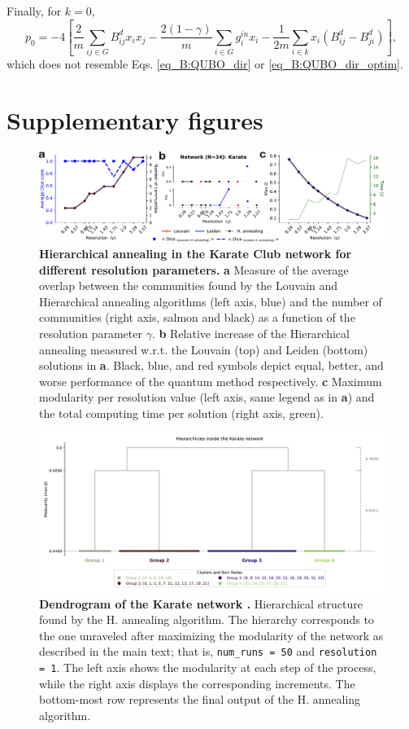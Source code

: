 \documentclass[pdflatex,sn-mathphys-num]{sn-jnl}%
\begin{document}
Finally, for $k=0$, $$p_0 = -4 \left[ \frac{2}{m} \sum_{ij\in G} B_{ij}^d x_i x_j - \frac{2(1-\gamma)}{m}\sum_{i \in G} g^{in}_i x_i - \frac{1}{2m} \sum_{i\in k} x_i \left(B_{ij}^d - B_{ji}^d \right)\right],$$ which does not resemble Eqs. \ref{eq_B:QUBO_dir} or \ref{eq_B:QUBO_dir_optim}.

\clearpage
\section*{Supplementary figures}

\begin{figure}[h]
    \centering
    \includegraphics[width=1\linewidth]{Figures/FigS1.pdf}
    \caption{\textbf{Hierarchical annealing in the Karate Club network for different resolution parameters.} \textbf{a} Measure of the average overlap between the communities found by the Louvain and Hierarchical annealing algorithms (left axis, blue) and the number of communities (right axis, salmon and black) as a function of the resolution parameter $\gamma$. \textbf{b} Relative increase of the Hierarchical annealing measured w.r.t. the Louvain (top) and Leiden (bottom) solutions in \textbf{a}. Black, blue, and red symbols depict equal, better, and worse performance of the quantum method respectively. \textbf{c} Maximum modularity per resolution value (left axis, same legend as in \textbf{a}) and the total computing time per solution (right axis, green).}
    \label{fig:resolution_karate}
\end{figure}

\begin{figure}[h]
    \centering
    \includegraphics[width=1\linewidth]{Figures/FigS2.pdf}
    \caption{\textbf{Dendrogram of the Karate network \cite{zachary1977information}.} Hierarchical structure found by the H. annealing algorithm. The hierarchy corresponds to the one unraveled after maximizing the modularity of the network as described in the main text; that is, {\tt num\_runs = 50} and {\tt resolution = 1}. The left axis shows the modularity at each step of the process, while the right axis displays the corresponding increments. The bottom-most row represents the final output of the H. annealing algorithm.}
    \label{fig:dendro_karate}
\end{figure}
\end{document}
